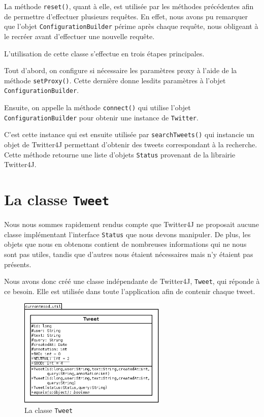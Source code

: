 \documentclass[12pt,a4paper]{report}
\begin{document}
La méthode \texttt{reset()}, quant à elle, est utilisée par les méthodes
précédentes afin de permettre d'effectuer plusieurs requêtes. En effet, nous
avons pu remarquer que l'objet \texttt{ConfigurationBuilder} périme après chaque
requête, nous obligeant à le recréer avant d'effectuer une nouvelle requête.

L'utilisation de cette classe s'effectue en trois étapes principales.

Tout d'abord, on configure si nécessaire les paramètres proxy à l'aide de la
méthode \texttt{setProxy()}. Cette dernière donne lesdits paramètres à l'objet
\texttt{ConfigurationBuilder}.

Ensuite, on appelle la méthode \texttt{connect()} qui utilise l'objet
\texttt{ConfigurationBuilder} pour obtenir une instance de \texttt{Twitter}.

C'est cette instance qui est ensuite utilisée par \texttt{searchTweets()} qui
instancie un objet de Twitter4J permettant d'obtenir des tweets correspondant
à la recherche. Cette méthode retourne une liste d'objets \texttt{Status}
provenant de la librairie Twitter4J.

\section{La classe \texttt{Tweet}}

Nous nous sommes rapidement rendus compte que Twitter4J ne proposait aucune
classe implémentant l'interface \texttt{Status} que nous devons manipuler. De
plus, les objets que nous en obtenons contient de nombreuses informations qui ne
nous sont pas utiles, tandis que d'autres nous étaient nécessaires mais
n'y étaient pas présents.

Nous avons donc créé une classe indépendante de Twitter4J, \texttt{Tweet}, qui
réponde à ce besoin. Elle est utilisée dans toute l'application afin de contenir
chaque tweet.

\begin{figure}[h]
	\centering
	\includegraphics[width=7cm]{img/uml_tweet.png}
	\caption{La classe \texttt{Tweet}}
	\label{uml_tweet}
\end{figure}
\end{document}
